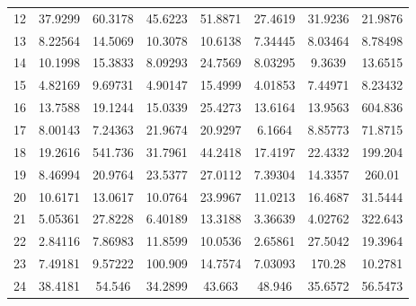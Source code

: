 \begin{center}
\begin{longtable}{cccccccc}
12 & 37.9299 & 60.3178 & 45.6223 & 51.8871 & 27.4619 & 31.9236 & 21.9876\\
13 & 8.22564 & 14.5069 & 10.3078 & 10.6138 & 7.34445 & 8.03464 & 8.78498\\
14 & 10.1998 & 15.3833 & 8.09293 & 24.7569 & 8.03295 & 9.3639 & 13.6515\\
15 & 4.82169 & 9.69731 & 4.90147 & 15.4999 & 4.01853 & 7.44971 & 8.23432\\
16 & 13.7588 & 19.1244 & 15.0339 & 25.4273 & 13.6164 & 13.9563 & 604.836\\
17 & 8.00143 & 7.24363 & 21.9674 & 20.9297 & 6.1664 & 8.85773 & 71.8715\\
18 & 19.2616 & 541.736 & 31.7961 & 44.2418 & 17.4197 & 22.4332 & 199.204\\
19 & 8.46994 & 20.9764 & 23.5377 & 27.0112 & 7.39304 & 14.3357 & 260.01\\
20 & 10.6171 & 13.0617 & 10.0764 & 23.9967 & 11.0213 & 16.4687 & 31.5444\\
21 & 5.05361 & 27.8228 & 6.40189 & 13.3188 & 3.36639 & 4.02762 & 322.643\\
22 & 2.84116 & 7.86983 & 11.8599 & 10.0536 & 2.65861 & 27.5042 & 19.3964\\
23 & 7.49181 & 9.57222 & 100.909 & 14.7574 & 7.03093 & 170.28 & 10.2781\\
24 & 38.4181 & 54.546 & 34.2899 & 43.663 & 48.946 & 35.6572 & 56.5473\\
\end{longtable}
\end{center}




